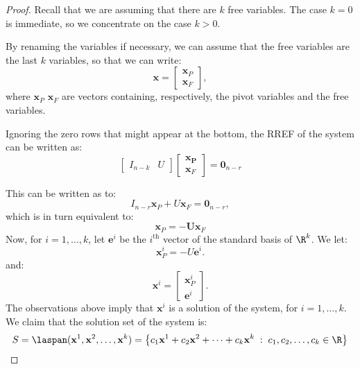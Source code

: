 \documentclass[12pt]{article}
\begin{document}
\begin{proof} Recall that we are assuming that there are $k$ free variables. The case $k=0$ is immediate, so we concentrate on the case $k>0$.

By renaming the variables if necessary, we can assume that the free variables are the last $k$ variables, so that we can write:
\[
\mathbf{x}=\begin{bmatrix}\mathbf{x}_P\\\mathbf{x}_F\end{bmatrix},
\]
where $\mathbf{x}_P$ $\mathbf{x}_F$ are vectors containing, respectively, the pivot variables and the free variables.

Ignoring the zero rows that might appear at the bottom, the RREF of the system can be written as:
\[
\begin{bmatrix}I_{n-k} & U\end{bmatrix}
\begin{bmatrix}\mathbf{x_P}\\\mathbf{x}_F\end{bmatrix}=\mathbf{0}_{n-r}
\]

%

This can be written as to:
\[
I_{n-r}\mathbf{x}_P+U\mathbf{x}_F=\mathbf{0}_{n-r},
\]
which is in turn equivalent to:
\begin{equation}
\label{eq-proof-homo-solution-alg}
\mathbf{x}_P=-\mathbf{U}\mathbf{x}_F
\end{equation}
Now, for $i=1,\ldots,k$, let $\mathbf{e}^i$ be the $i^{\text{th}}$ vector of the standard basis of $\R^k$. We let: 
\[
\mathbf{x}_P^{i}=-U\mathbf{e}^i.
\]
and:
\[
\mathbf{x}^i=\begin{bmatrix}\mathbf{x}_P^i\\\mathbf{e}^i\end{bmatrix}.
\]
The observations above imply that $\mathbf{x}^i$ is a solution of the system, for $i=1,\ldots,k$. We claim that the solution set of the system is:
\[
S=\laspan(\mathbf{x}^1,\mathbf{x}^2,\ldots,\mathbf{x}^k)=
\left\{
c_1\mathbf{x}^1+c_2\mathbf{x}^2+\cdots+c_k\mathbf{x}^k
\;:\; c_1, c_2,\ldots,c_k\in\R
\right\}
\]


\end{proof}
\end{document}
